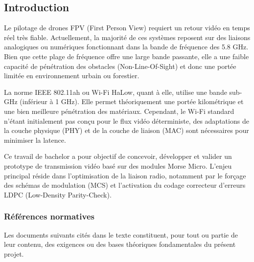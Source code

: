 \subsection{Introduction}
Le pilotage de drones FPV (First Person View) requiert un retour vidéo en temps 
réel très fiable. Actuellement, la majorité de ces systèmes reposent sur des liaisons 
analogiques ou numériques fonctionnant dans la bande de fréquence des 5.8 GHz. Bien que cette plage de fréquence offre une 
large bande passante, elle a une faible capacité de pénétration des obstacles (Non-Line-Of-Sight) et
donc une portée limitée en environnement urbain ou forestier.

La norme IEEE 802.11ah ou Wi-Fi HaLow, quant à elle, utilise une bande 
sub-GHz (inférieur à 1 GHz). Elle permet théoriquement une portée kilométrique et une bien meilleure pénétration des 
matériaux. Cependant, le Wi-Fi standard n'étant initialement pas conçu pour le flux vidéo 
déterministe, des adaptations de la couche physique (PHY) et de la couche de liaison (MAC) sont 
nécessaires pour minimiser la latence.

Ce travail de bachelor a pour objectif de concevoir, développer et valider un prototype de transmission 
vidéo basé sur des modules Morse Micro. L'enjeu principal réside dans l'optimisation de la 
liaison radio, notamment par le forçage des schémas de modulation (MCS) et l'activation du codage correcteur 
d'erreurs LDPC (Low-Density Parity-Check).

\subsubsection{Références normatives}
Les documents suivants cités dans le texte constituent, pour tout ou partie de leur contenu, des 
exigences ou des bases théoriques fondamentales du présent projet.

\vspace{0.5cm}

